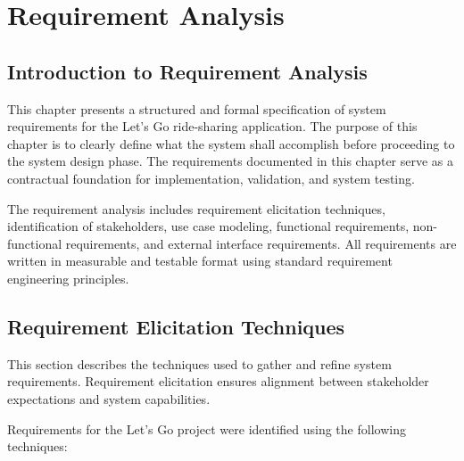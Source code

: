 
\chapter{Requirement Analysis}

\section{Introduction to Requirement Analysis}

This chapter presents a structured and formal specification of system requirements for the Let's Go ride-sharing application. The purpose of this chapter is to clearly define what the system shall accomplish before proceeding to the system design phase. The requirements documented in this chapter serve as a contractual foundation for implementation, validation, and system testing.

The requirement analysis includes requirement elicitation techniques, identification of stakeholders, use case modeling, functional requirements, non-functional requirements, and external interface requirements. All requirements are written in measurable and testable format using standard requirement engineering principles.

\section{Requirement Elicitation Techniques}

This section describes the techniques used to gather and refine system requirements. Requirement elicitation ensures alignment between stakeholder expectations and system capabilities.

Requirements for the Let's Go project were identified using the following techniques:


